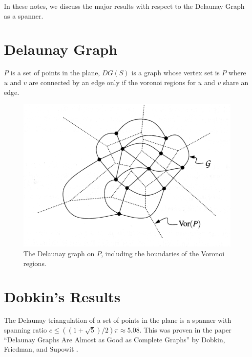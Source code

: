 \documentclass{tufte-handout}
\title{\DocTitle}
\author{\DocAuthor}
\begin{document}
\maketitle
\vspace{1cm}

In these notes, we discuss the major results with respect to the
Delaunay Graph as a spanner.

\part{Delaunay Graph}

$P$ is a set of points in the plane, $DG(S)$ is a graph whose vertex
set is $P$ where $u$ and $v$ are connected by an edge only if the
voronoi regions for $u$ and $v$ share an edge.

\begin{figure}
  \includegraphics{figures/delaunay_graph.png}
  \caption{The Delaunay graph on $P$, including the boundaries of the
    Voronoi regions.}
\end{figure}

\part{Dobkin's Results}

The Delaunay triangulation of a set of points in the plane is a
spanner with spanning ratio $c \le ((1 + \sqrt{5})/2)\pi \approx
5.08$.  This was proven in the paper ``Delaunay Graphs Are Almost as
Good as Complete Graphs'' by Dobkin, Friedman, and Supowit
\cite{Dobkin:1987} \cite{Dobkin:1990}.
\end{document}
